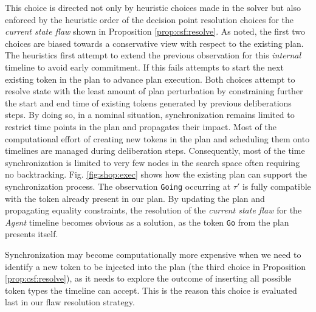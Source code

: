 
This choice is directed not only by heuristic choices made in the
solver but also enforced by the heuristic order of the decision point
resolution choices for the {\em current state flaw} shown in
Proposition \ref{prop:csf:resolve}. As noted, the first two choices
are biased towards a conservative view with respect to the existing
plan. The heuristics first attempt to extend the previous observation
for this {\em internal} timeline to avoid early commitment. If this
fails \rx attempts to start the next existing token in the plan to
advance plan execution. Both choices attempt to resolve state with the
least amount of plan perturbation by constraining further the start
and end time of existing tokens generated by previous deliberations
steps. By doing so, in a nominal situation, synchronization remains
limited to restrict time points in the plan and propagates their
impact. Most of the computational effort of creating new tokens in the
plan and scheduling them onto timelines are managed during
deliberation steps. Consequently, most of the time synchronization is
limited to very few nodes in the \eu search space often requiring no
backtracking. Fig. \ref{fig:shop:exec} shows how the existing plan can
support the synchronization process. The observation \texttt{Going}
occurring at $\tau'$ is fully compatible with the token already present
in our plan. By updating the plan and propagating equality constraints,
the resolution of the {\em current state flaw} for the {\em Agent}
timeline becomes obvious as a solution, as the token \texttt{Go} from
the plan presents itself.

Synchronization may become computationally more expensive when we need
to identify a new token to be injected into the plan (the third choice
in Proposition \ref{prop:csf:resolve}), as it needs to explore the
outcome of inserting all possible token types the timeline can accept.
This is the reason this choice is evaluated last in our flaw
resolution strategy.



